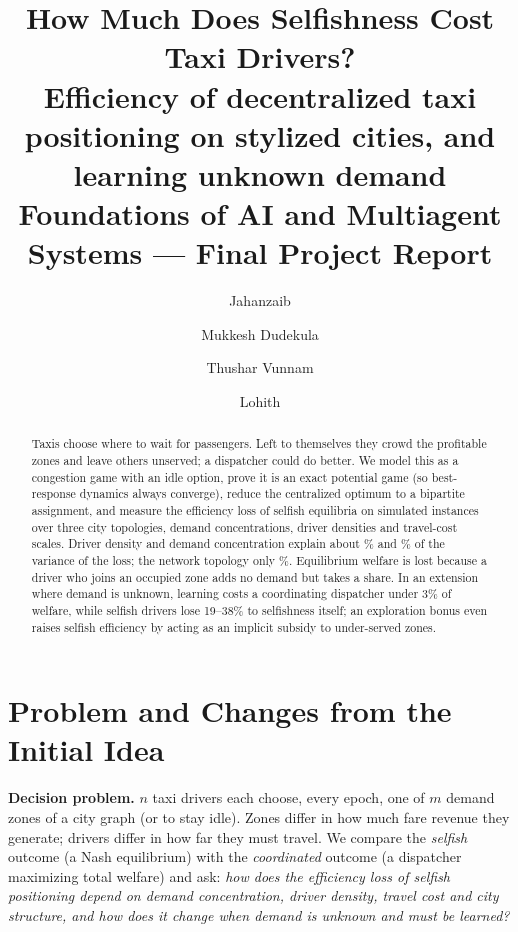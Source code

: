 \documentclass[11pt]{article}
\title{\vspace{-1.2em}\textbf{How Much Does Selfishness Cost Taxi Drivers?}\\[2pt]
\large Efficiency of decentralized taxi positioning on stylized cities, and learning unknown demand\\[2pt]
\normalsize Foundations of AI and Multiagent Systems --- Final Project Report}
\author{Jahanzaib \and Mukkesh Dudekula \and Thushar Vunnam \and Lohith}
\date{}
\begin{document}
\maketitle\vspace{-1.5em}
\begin{abstract}\noindent
Taxis choose where to wait for passengers. Left to themselves they crowd the profitable zones and leave others unserved; a dispatcher could do better. We model this as a congestion game with an idle option, prove it is an exact potential game (so best-response dynamics always converge), reduce the centralized optimum to a bipartite assignment, and measure the efficiency loss of selfish equilibria on \nInstTotal{} simulated instances over three city topologies, demand concentrations, driver densities and travel-cost scales. Driver density and demand concentration explain about \etaRho{}\% and \etaAlpha{}\% of the variance of the loss; the network topology only \etaTopo{}\%. Equilibrium welfare is lost because a driver who joins an occupied zone adds no demand but takes a share. In an extension where demand is unknown, learning costs a coordinating dispatcher under 3\% of welfare, while selfish drivers lose 19--38\% to selfishness itself; an exploration bonus even raises selfish efficiency by acting as an implicit subsidy to under-served zones.
\end{abstract}

\section{Problem and Changes from the Initial Idea}
\textbf{Decision problem.} $n$ taxi drivers each choose, every epoch, one of $m$ demand zones of a city graph (or to stay idle). Zones differ in how much fare revenue they generate; drivers differ in how far they must travel. We compare the \emph{selfish} outcome (a Nash equilibrium) with the \emph{coordinated} outcome (a dispatcher maximizing total welfare) and ask: \emph{how does the efficiency loss of selfish positioning depend on demand concentration, driver density, travel cost and city structure, and how does it change when demand is unknown and must be learned?}
\end{document}
